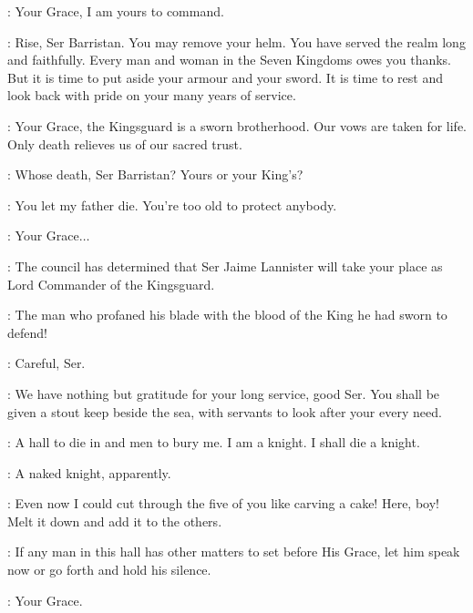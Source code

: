 \SELMY: Your Grace, I am yours to command. 

\CERSEI: Rise, Ser Barristan. You may remove your helm.  You have served the realm long and faithfully. Every man and woman in the Seven Kingdoms owes you thanks. But it is time to put aside your armour and your sword. It is time to rest and look back with pride on your many years of service. 

\SELMY: Your Grace, the Kingsguard is a sworn brotherhood. Our vows are taken for life. Only death relieves us of our sacred trust. 

\CERSEI: Whose death, Ser Barristan? Yours or your King's? 

\JOFFREY: You let my father die. You're too old to protect anybody. 

\SELMY: Your Grace$\ldots$ 

\CERSEI: The council has determined that Ser Jaime Lannister will take your place as Lord Commander of the Kingsguard.  

\SELMY: The man who profaned his blade with the blood of the King he had sworn to defend! 

\CERSEI: Careful, Ser. 

\VARYS: We have nothing but gratitude for your long service, good Ser. You shall be given a stout keep beside the sea, with servants to look after your every need. 

\SELMY: A hall to die in and men to bury me.  I am a knight. I shall die a knight. 

\LITTLEFINGER: A naked knight, apparently.


\SELMY:  Even now I could cut through the five of you like carving a cake! Here, boy!  Melt it down and add it to the others. 

\HERALD: If any man in this hall has other matters to set before His Grace, let him speak now or go forth and hold his silence. 

\SANSA: Your Grace. 

